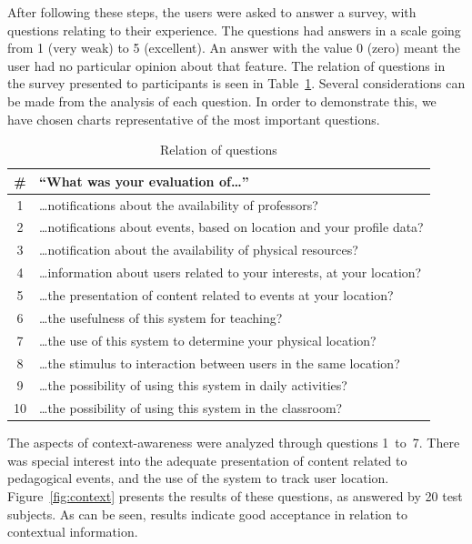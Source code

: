 \documentclass[5p,authoryear]{elsarticle}
\begin{document}
After following these steps, the users were asked to answer a survey, with
questions relating to their experience. The questions had answers in a scale
going from 1 (very weak) to 5 (excellent). An answer with the value 0 (zero)
meant the user had no particular opinion about that feature. The relation of
questions in the survey presented to participants is seen in
Table~\ref{tab:questions}. Several considerations can be made from the analysis
of each question. In order to demonstrate this, we have chosen charts
representative of the most important questions. 

\begin{table}
  \footnotesize
  \begin{tabular}{cp{7.5cm}}
    \toprule
    \# & ``What was your evaluation of\ldots'' \\
    \midrule
     1 & \ldots{}notifications about the availability of professors? \\ 
     2 & \ldots{}notifications about events, based on location and your profile data? \\
     3 & \ldots{}notification about the availability of physical resources? \\
     4 & \ldots{}information about users related to your interests, at your location? \\
     5 & \ldots{}the presentation of content related to events at your location? \\
     6 & \ldots{}the usefulness of this system for teaching? \\
     7 & \ldots{}the use of this system to determine your physical location? \\
     8 & \ldots{}the stimulus to interaction between users in the same location? \\
     9 & \ldots{}the possibility of using this system in daily activities? \\
    10 & \ldots{}the possibility of using this system in the classroom? \\  
    \bottomrule
  \end{tabular}
  \caption{Relation of questions}
  \label{tab:questions}
\end{table}


The aspects of context-awareness were analyzed through questions 1 to 7. There
was special interest into the adequate presentation of content related to
pedagogical events, and the use of the system to track user location.
Figure~\ref{fig:context} presents the results of these questions, as answered
by 20 test subjects. As can be seen, results indicate good acceptance in
relation to contextual information. 
\end{document}
